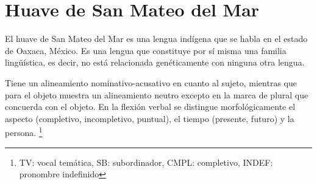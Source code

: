 \section*{Huave de San Mateo del Mar}

\noindent El huave de San Mateo del Mar es una lengua indígena que se habla en el estado de Oaxaca, México. Es una lengua que constituye por sí misma una familia lingüística, es decir, no está relacionada genéticamente con ninguna otra lengua.

Tiene un alineamiento nominativo-acusativo en cuanto al sujeto, mientras que para el objeto muestra un alineamiento neutro excepto en la marca de plural que concuerda con el objeto. En la flexión verbal se distingue morfológicamente el aspecto (completivo, incompletivo, puntual), el tiempo (presente, futuro) y la persona.
\footnote{TV: vocal temática, SB: subordinador, CMPL: completivo, INDEF: pronombre indefinido}
\vspace{0.5cm}

